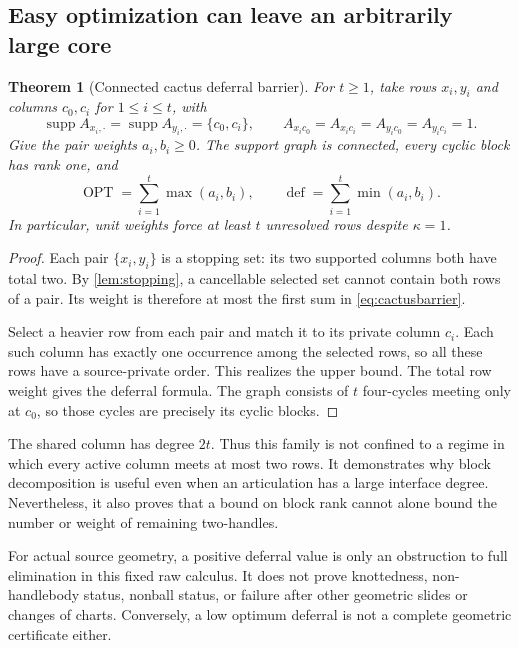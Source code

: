 \documentclass[11pt,letterpaper]{article}
\newtheorem{theorem}{Theorem}[section]
\theoremstyle{definition}
\theoremstyle{remark}
\newcommand{\OPT}{\operatorname{OPT}}
\newcommand{\defw}{\operatorname{def}}
\newcommand{\supp}{\operatorname{supp}}
\begin{document}
\subsection{Easy optimization can leave an arbitrarily large core}
\begin{theorem}[Connected cactus deferral barrier]
\label{thm:cactusbarrier}
For $t\ge1$, take rows $x_i,y_i$ and columns $c_0,c_i$ for $1\le i\le t$, with
\[
 \supp A_{x_i,\cdot}=\supp A_{y_i,\cdot}=\{c_0,c_i\},
 \qquad A_{x_i c_0}=A_{x_i c_i}=A_{y_i c_0}=A_{y_i c_i}=1.
\]
Give the pair weights $a_i,b_i\ge0$. The support graph is connected, every cyclic block has rank one, and
\begin{equation}
 \OPT=\sum_{i=1}^t\max(a_i,b_i),\qquad
 \defw=\sum_{i=1}^t\min(a_i,b_i).
 \label{eq:cactusbarrier}
\end{equation}
In particular, unit weights force at least $t$ unresolved rows despite $\kappa=1$.
\end{theorem}
\begin{proof}
Each pair $\{x_i,y_i\}$ is a stopping set: its two supported columns both have total two. By \cref{lem:stopping}, a cancellable selected set cannot contain both rows of a pair. Its weight is therefore at most the first sum in \cref{eq:cactusbarrier}.

Select a heavier row from each pair and match it to its private column $c_i$. Each such column has exactly one occurrence among the selected rows, so all these rows have a source-private order. This realizes the upper bound. The total row weight gives the deferral formula. The graph consists of $t$ four-cycles meeting only at $c_0$, so those cycles are precisely its cyclic blocks.
\end{proof}

The shared column has degree $2t$. Thus this family is not confined to a regime in which every active column meets at most two rows. It demonstrates why block decomposition is useful even when an articulation has a large interface degree. Nevertheless, it also proves that a bound on block rank cannot alone bound the number or weight of remaining two-handles.

For actual source geometry, a positive deferral value is only an obstruction to full elimination in this fixed raw calculus. It does not prove knottedness, non-handlebody status, nonball status, or failure after other geometric slides or changes of charts. Conversely, a low optimum deferral is not a complete geometric certificate either.
\end{document}
